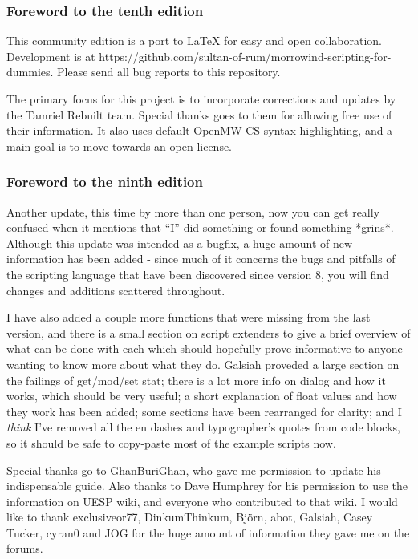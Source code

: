 \documentclass[oneside]{article}
\begin{document}
\hypertarget{foreword-to-the-tenth-edition}{%
\subsubsection{\texorpdfstring{\hfill\break
Foreword to the tenth edition}{Foreword to the ninth edition}}\label{foreword-to-the-tenth-edition}}

This community edition is a port to LaTeX for easy and open collaboration. Development is at https://github.com/sultan-of-rum/morrowind-scripting-for-dummies. Please send all bug reports to this repository.

The primary focus for this project is to incorporate corrections and updates by the Tamriel Rebuilt team. Special thanks goes to them for allowing free use of their information. It also uses default OpenMW-CS syntax highlighting, and a main goal is to move towards an open license.

\hypertarget{foreword-to-the-ninth-edition}{%
\subsubsection{\texorpdfstring{\hfill\break
Foreword to the ninth edition}{Foreword to the ninth edition}}\label{foreword-to-the-ninth-edition}}

Another update, this time by more than one person, now you can get really confused when it mentions that ``I'' did something or found something *grins*. Although this update was intended as a bugfix, a huge amount of new information has been added - since much of it concerns the bugs and pitfalls of the scripting language that have been discovered since version 8, you will find changes and additions scattered throughout.

I have also added a couple more functions that were missing from the last version, and there is a small section on script extenders to give a brief overview of what can be done with each which should hopefully prove informative to anyone wanting to know more about what they do. Galsiah proveded a large section on the failings of get/mod/set stat; there is a lot more info on dialog and how it works, which should be very useful; a short explanation of float values and how they work has
been added; some sections have been rearranged for clarity; and I \emph{think} I've removed all the en dashes and typographer's quotes from code blocks, so it should be safe to copy-paste most of the example scripts now.

Special thanks go to GhanBuriGhan, who gave me permission to update his indispensable guide. Also thanks to Dave Humphrey for his permission to use the information on UESP wiki, and everyone who contributed to that wiki. I would like to thank exclusiveor77, DinkumThinkum, Björn, abot, Galsiah, Casey Tucker, cyran0 and JOG for the huge amount of information they gave me on the forums.
\end{document}
